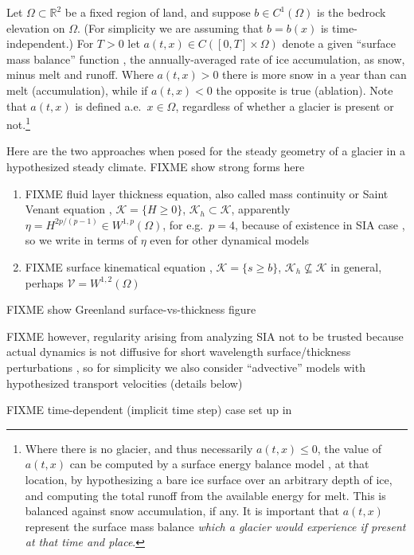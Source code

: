 \documentclass[hidelinks,onefignum,onetabnum,final]{siamart220329}  %
\newcommand{\RR}{\mathbb{R}}
\newcommand{\cK}{\mathcal{K}}
\newcommand{\cV}{\mathcal{V}}
\begin{document}
Let $\Omega \subset \RR^2$ be a fixed region of land, and suppose $b \in C^1(\Omega)$ is the bedrock elevation on $\Omega$.  (For simplicity we are assuming that $b=b(x)$ is time-independent.)  For $T>0$ let $a(t,x) \in C([0,T] \times \Omega)$ denote a given ``surface mass balance'' function \cite{GreveBlatter2009}, the annually-averaged rate of ice accumulation, as snow, minus melt and runoff.  Where $a(t,x)>0$ there is more snow in a year than can melt (accumulation), while if $a(t,x)<0$ the opposite is true (ablation).  Note that $a(t,x)$ is defined a.e.~$x\in \Omega$, regardless of whether a glacier is present or not.\footnote{Where there is no glacier, and thus necessarily $a(t,x) \le 0$, the value of $a(t,x)$ can be computed by a surface energy balance model \cite{GreveBlatter2009}, at that location, by hypothesizing a bare ice surface over an arbitrary depth of ice, and computing the total runoff from the available energy for melt.  This is balanced against snow accumulation, if any.  It is important that $a(t,x)$ represent the surface mass balance \emph{which a glacier would experience if present at that time and place}.}

Here are the two approaches when posed for the steady geometry of a glacier in a hypothesized steady climate.  FIXME show strong forms here

\begin{enumerate}
\item FIXME fluid layer thickness equation, also called mass continuity or Saint Venant equation \cite{JouvetBueler2012}, $\cK = \{H\ge 0\}$, $\cK_h \subset \cK$, apparently $\eta = H^{2p/(p-1)} \in W^{1,p}(\Omega)$, for e.g.~$p=4$, because of existence in SIA case \cite{JouvetBueler2012}, so we write in terms of $\eta$ even for other dynamical models
\item FIXME surface kinematical equation \cite{GreveBlatter2009}, $\cK = \{s\ge b\}$, $\cK_h \nsubseteq \cK$ in general, perhaps $\cV = W^{1,2}(\Omega)$
\end{enumerate}

FIXME show Greenland surface-vs-thickness figure

FIXME however, regularity arising from analyzing SIA not to be trusted because actual dynamics is not diffusive for short wavelength surface/thickness perturbations \cite{Pattynetal2008}, so for simplicity we also consider ``advective'' models with hypothesized transport velocities (details below)

FIXME time-dependent (implicit time step) case set up in \cite{Bueler2021conservation}
\end{document}
